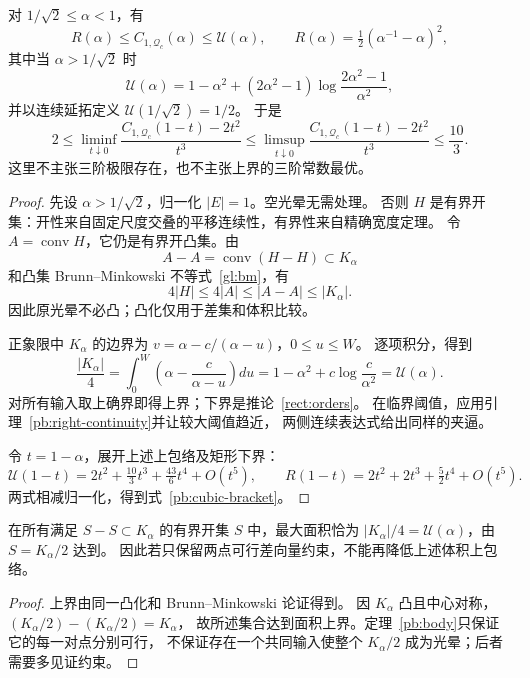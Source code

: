 \begin{theorem}[全体体积的显式上界与三阶夹逼]\label{pb:volume}
对 $1/\sqrt2\le\alpha<1$，有
\begin{equation}\label{pb:finite-bound}
 R(\alpha)\le C_{1,\mathcal Q_c}(\alpha)\le\mathcal U(\alpha),
 \qquad R(\alpha)=\tfrac12(\alpha^{-1}-\alpha)^2,
\end{equation}
其中当 $\alpha>1/\sqrt2$ 时
\[
 \mathcal U(\alpha)=1-\alpha^2+(2\alpha^2-1)
 \log\frac{2\alpha^2-1}{\alpha^2},
\]
并以连续延拓定义 $\mathcal U(1/\sqrt2)=1/2$。
于是
\begin{equation}\label{pb:cubic-bracket}
 2\le\liminf_{t\downarrow0}\frac{C_{1,\mathcal Q_c}(1-t)-2t^2}{t^3}
 \le\limsup_{t\downarrow0}\frac{C_{1,\mathcal Q_c}(1-t)-2t^2}{t^3}
 \le\frac{10}{3}.
\end{equation}
这里不主张三阶极限存在，也不主张上界的三阶常数最优。
\end{theorem}
\begin{proof}
先设 $\alpha>1/\sqrt2$，归一化 $|E|=1$。空光晕无需处理。
否则 $H$ 是有界开集：开性来自固定尺度交叠的平移连续性，有界性来自精确宽度定理。
令 $A=\operatorname{conv}H$，它仍是有界开凸集。由
\[
 A-A=\operatorname{conv}(H-H)\subset K_\alpha
\]
和凸集 Brunn--Minkowski 不等式~\ref{gl:bm}，有
\[
 4|H|\le4|A|\le|A-A|\le|K_\alpha|.
\]
因此原光晕不必凸；凸化仅用于差集和体积比较。

正象限中 $K_\alpha$ 的边界为
$v=\alpha-c/(\alpha-u)$，$0\le u\le W$。
逐项积分，得到
\[
 \frac{|K_\alpha|}{4}
 =\int_0^W\left(\alpha-\frac{c}{\alpha-u}\right)du
 =1-\alpha^2+c\log\frac{c}{\alpha^2}=\mathcal U(\alpha).
\]
对所有输入取上确界即得上界；下界是推论~\ref{rect:orders}。
在临界阈值，应用引理~\ref{pb:right-continuity}并让较大阈值趋近，
两侧连续表达式给出同样的夹逼。

令 $t=1-\alpha$，展开上述上包络及矩形下界：
\[
 \mathcal U(1-t)=2t^2+\tfrac{10}{3}t^3+\tfrac{43}{6}t^4+O(t^5),
 \qquad R(1-t)=2t^2+2t^3+\tfrac52t^4+O(t^5).
\]
两式相减归一化，得到式~\eqref{pb:cubic-bracket}。
\end{proof}

\begin{proposition}[两点几何方法的精确边界]\label{pb:pair-only}
在所有满足 $S-S\subset K_\alpha$ 的有界开集 $S$ 中，最大面积恰为
$|K_\alpha|/4=\mathcal U(\alpha)$，由 $S=K_\alpha/2$ 达到。
因此若只保留两点可行差向量约束，不能再降低上述体积上包络。
\end{proposition}
\begin{proof}
上界由同一凸化和 Brunn--Minkowski 论证得到。
因 $K_\alpha$ 凸且中心对称，$(K_\alpha/2)-(K_\alpha/2)=K_\alpha$，
故所述集合达到面积上界。定理~\ref{pb:body}只保证它的每一对点分别可行，
不保证存在一个共同输入使整个 $K_\alpha/2$ 成为光晕；后者需要多见证约束。
\end{proof}

